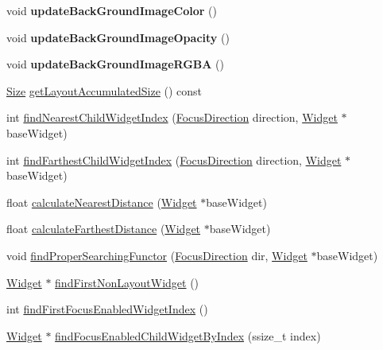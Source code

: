 \begin{DoxyCompactItemize}
void {\bfseries update\+Back\+Ground\+Image\+Color} ()
\item 
\mbox{\label{classui_1_1Layout_a2661d032e11a45d70ac33c00d70b010c}} 
void {\bfseries update\+Back\+Ground\+Image\+Opacity} ()
\item 
\mbox{\label{classui_1_1Layout_ac52d74ef9c7a8980620ca54cc9e4dd55}} 
void {\bfseries update\+Back\+Ground\+Image\+R\+G\+BA} ()
\item 
\hyperlink{classSize}{Size} \hyperlink{classui_1_1Layout_ae56f064b4fa0475a5caa6dc325d7bf73}{get\+Layout\+Accumulated\+Size} () const
\item 
int \hyperlink{classui_1_1Layout_a522d31325af855e6a5a7ed38f1878a9b}{find\+Nearest\+Child\+Widget\+Index} (\hyperlink{classui_1_1Widget_a8ae8e8fc793a04a87584205cd1e8a8a5}{Focus\+Direction} direction, \hyperlink{classui_1_1Widget}{Widget} $\ast$base\+Widget)
\item 
int \hyperlink{classui_1_1Layout_aa40ce38ab200edba57e704834b395a4a}{find\+Farthest\+Child\+Widget\+Index} (\hyperlink{classui_1_1Widget_a8ae8e8fc793a04a87584205cd1e8a8a5}{Focus\+Direction} direction, \hyperlink{classui_1_1Widget}{Widget} $\ast$base\+Widget)
\item 
float \hyperlink{classui_1_1Layout_a2f584f68c1cb52969140e28af913005b}{calculate\+Nearest\+Distance} (\hyperlink{classui_1_1Widget}{Widget} $\ast$base\+Widget)
\item 
float \hyperlink{classui_1_1Layout_a57187bccc77bc2ca377817bb1a1a15a1}{calculate\+Farthest\+Distance} (\hyperlink{classui_1_1Widget}{Widget} $\ast$base\+Widget)
\item 
void \hyperlink{classui_1_1Layout_a9b6137410a64eff4c2a630aa7d2a703f}{find\+Proper\+Searching\+Functor} (\hyperlink{classui_1_1Widget_a8ae8e8fc793a04a87584205cd1e8a8a5}{Focus\+Direction} dir, \hyperlink{classui_1_1Widget}{Widget} $\ast$base\+Widget)
\item 
\hyperlink{classui_1_1Widget}{Widget} $\ast$ \hyperlink{classui_1_1Layout_a39b5467fe238809d5837765ad1a2317e}{find\+First\+Non\+Layout\+Widget} ()
\item 
int \hyperlink{classui_1_1Layout_a9a84f2518571e511862189f3c230b984}{find\+First\+Focus\+Enabled\+Widget\+Index} ()
\item 
\hyperlink{classui_1_1Widget}{Widget} $\ast$ \hyperlink{classui_1_1Layout_ab470e2f8d9a62e94278108dec416d589}{find\+Focus\+Enabled\+Child\+Widget\+By\+Index} (ssize\+\_\+t index)

\end{DoxyCompactItemize}
